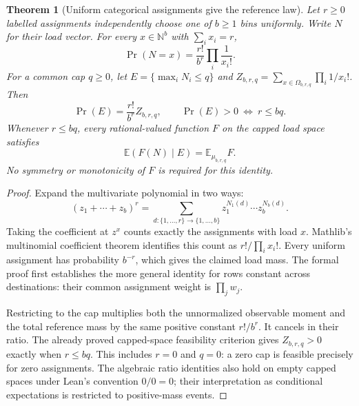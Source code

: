 \documentclass[11pt]{article}
\newtheorem{theorem}{Theorem}
\begin{document}
\begin{theorem}[Uniform categorical assignments give the reference law]\label{thm:leanuniform}
Let $r\geq0$ labelled assignments independently choose one of $b\geq1$
bins uniformly. Write $N$ for their load vector. For every $x\in\mathbb N^b$
with $\sum_i x_i=r$,
\[
 \Pr(N=x)=\frac{r!}{b^r}\prod_i\frac1{x_i!}.
\]
For a common cap $q\geq0$, let $E=\{\max_i N_i\leq q\}$ and
$Z_{b,r,q}=\sum_{x\in\Omega_{b,r,q}}\prod_i1/x_i!$. Then
\[
 \Pr(E)=\frac{r!}{b^r}Z_{b,r,q},\qquad
 \Pr(E)>0\ \Longleftrightarrow\ r\leq bq.
\]
Whenever $r\leq bq$, every rational-valued function $F$ on the capped
load space satisfies
\[
 \mathbb E(F(N)\mid E)=\mathbb E_{\mu_{b,r,q}}F.
\]
No symmetry or monotonicity of $F$ is required for this identity.
\end{theorem}
\begin{proof}
Expand the multivariate polynomial in two ways:
\[
 (z_1+\cdots+z_b)^r
   =\sum_{d:\{1,\ldots,r\}\to\{1,\ldots,b\}}
       z_1^{N_1(d)}\cdots z_b^{N_b(d)}.
\]
Taking the coefficient at $z^x$ counts exactly the assignments with load
$x$. Mathlib's multinomial coefficient theorem identifies this count as
$r!/\prod_i x_i!$. Every uniform assignment has probability $b^{-r}$,
which gives the claimed load mass. The formal proof first establishes
the more general identity for rows constant across destinations: their
common assignment weight is $\prod_j w_j$.

Restricting to the cap multiplies both the unnormalized observable moment
and the total reference mass by the same positive constant $r!/b^r$.
It cancels in their ratio. The already proved capped-space feasibility
criterion gives $Z_{b,r,q}>0$ exactly when $r\leq bq$. This includes
$r=0$ and $q=0$: a zero cap is feasible precisely for zero assignments.
The algebraic ratio identities also hold on empty capped spaces under
Lean's convention $0/0=0$; their interpretation as conditional
expectations is restricted to positive-mass events.


\end{proof}
\end{document}
